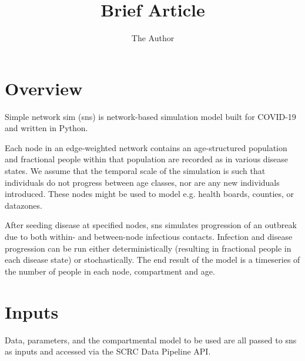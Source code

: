 \documentclass[11pt]{article}
\title{Brief Article}
\author{The Author}
\begin{document}
\section{Overview}

Simple network sim (sns) is network-based simulation model built for COVID-19 and written in Python.

Each node in an edge-weighted network contains an age-structured population and fractional people within that population are recorded as in various disease states. We assume that the temporal scale of the simulation is such that individuals do not progress between age classes, nor are any new individuals introduced. These nodes might be used to model e.g. health boards, counties, or datazones.  

After seeding disease at specified nodes, sns simulates progression of an outbreak due to both within- and between-node infectious contacts.  Infection and disease progression can be run either deterministically (resulting in fractional people in each disease state) or stochastically.  The end result of the model is a timeseries of the number of people in each node, compartment and age.

\section{Inputs}

Data, parameters, and the compartmental model to be used are all passed to sns as inputs and accessed via the SCRC Data Pipeline API.  
\end{document}
